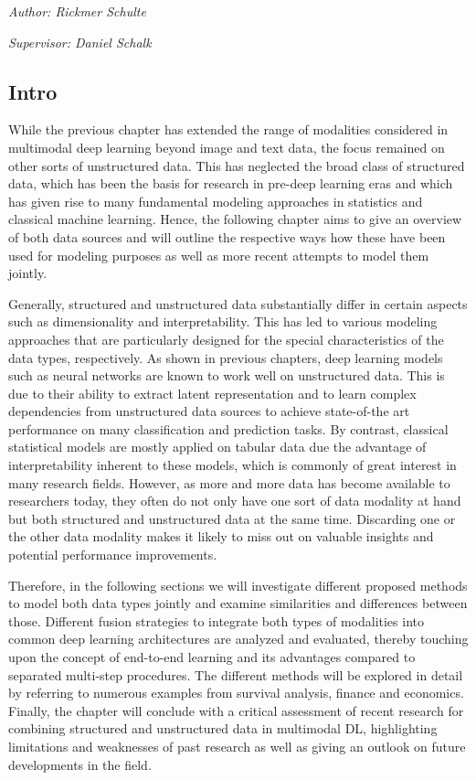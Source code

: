 \documentclass[
]{krantz}
\begin{document}
\emph{Author: Rickmer Schulte}

\emph{Supervisor: Daniel Schalk}

\hypertarget{intro}{%
\subsection{Intro}\label{intro}}

While the previous chapter has extended the range of modalities considered in multimodal deep learning beyond image and text data, the focus remained on other sorts of unstructured data. This has neglected the broad class of structured data, which has been the basis for research in pre-deep learning eras and which has given rise to many fundamental modeling approaches in statistics and classical machine learning. Hence, the following chapter aims to give an overview of both data sources and will outline the respective ways how these have been used for modeling purposes as well as more recent attempts to model them jointly.

Generally, structured and unstructured data substantially differ in certain aspects such as dimensionality and interpretability. This has led to various modeling approaches that are particularly designed for the special characteristics of the data types, respectively. As shown in previous chapters, deep learning models such as neural networks are known to work well on unstructured data. This is due to their ability to extract latent representation and to learn complex dependencies from unstructured data sources to achieve state-of-the art performance on many classification and prediction tasks. By contrast, classical statistical models are mostly applied on tabular data due the advantage of interpretability inherent to these models, which is commonly of great interest in many research fields. However, as more and more data has become available to researchers today, they often do not only have one sort of data modality at hand but both structured and unstructured data at the same time. Discarding one or the other data modality makes it likely to miss out on valuable insights and potential performance improvements.

Therefore, in the following sections we will investigate different proposed methods to model both data types jointly and examine similarities and differences between those. Different fusion strategies to integrate both types of modalities into common deep learning architectures are analyzed and evaluated, thereby touching upon the concept of end-to-end learning and its advantages compared to separated multi-step procedures. The different methods will be explored in detail by referring to numerous examples from survival analysis, finance and economics.
Finally, the chapter will conclude with a critical assessment of recent research for combining structured and unstructured data in multimodal DL, highlighting limitations and weaknesses of past research as well as giving an outlook on future developments in the field.
\end{document}
